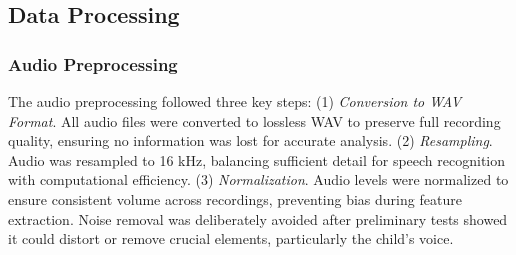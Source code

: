 
\subsection{Data Processing}
\subsubsection{Audio Preprocessing}
The audio preprocessing followed three key steps:
(1) \textit{Conversion to WAV Format}. 
All audio files were converted to lossless WAV to preserve full recording quality, ensuring no information was lost for accurate analysis.
(2) \textit{Resampling}. 
Audio was resampled to 16 kHz, balancing sufficient detail for speech recognition with computational efficiency.
(3) \textit{Normalization}.  Audio levels were normalized to ensure consistent volume across recordings, preventing bias during feature extraction. Noise removal was deliberately avoided after preliminary tests showed it could distort or remove crucial elements, particularly the child’s voice.



